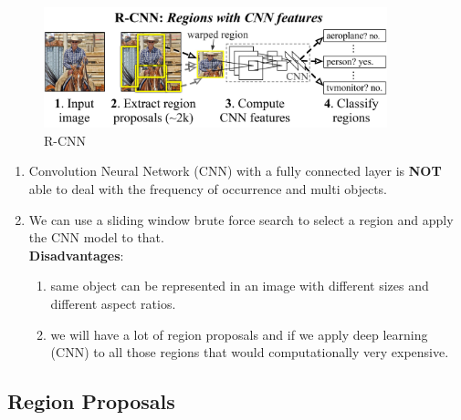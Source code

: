 \begin{figure}[H]
    \centering
    \includegraphics[width=\linewidth, height=3.5cm, keepaspectratio]{Pictures/convolutional-neural-network/rcnn-splash-method.jpg}
    \caption*{R-CNN}
\end{figure}

\begin{enumerate}
    \item Convolution Neural Network (CNN) with a fully connected layer is \textbf{NOT} able to deal with the frequency of occurrence and multi objects.

    \item We can use a sliding window brute force search to select a region and apply the CNN model to that.\\
    \textbf{Disadvantages}:
    \begin{enumerate}
        \item same object can be represented in an image with different sizes and different aspect ratios.

        \item we will have a lot of region proposals and if we apply deep learning (CNN) to all those regions that would computationally very expensive.

    \end{enumerate}
    
\end{enumerate}

\subsection{Region Proposals \cite{arxiv-1311.2524v5-rcnn,https://www.geeksforgeeks.org/r-cnn-region-based-cnns/}}

